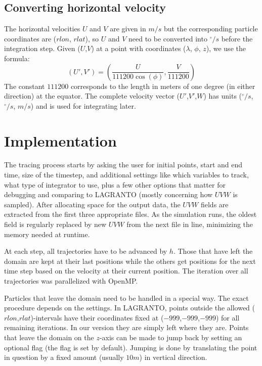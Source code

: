 \subsection{Converting horizontal velocity}
The horizontal velocities $U$ and $V$ are given in $m/s$ but the corresponding particle coordinates are ($rlon$, $rlat$), so $U$ and $V$ need to be converted into  $^\circ/s$ before the integration step. Given ($U$,$V$) at a point with coordinates ($\lambda$, $\phi$, $z$), we use the formula:
\begin{equation}
(U',V') = (\frac{U}{111200 \cos(\phi)}, \frac{V}{111200} )
\end{equation}
The constant $111200$ corresponds to the length in meters of one degree (in either direction) at the equator. The complete velocity vector ($U'$,$V'$,$W$) has units ($^\circ/s$, $^\circ/s$, $m/s$) and is used for integrating later.

\section{Implementation}
The tracing process starts by asking the user for initial points, start and end time, size of the timestep, and additional settings like which variables to track, what type of integrator to use, plus a few other options that matter for debugging and comparing to LAGRANTO (mostly concerning how $UVW$ is sampled). After allocating space for the output data, the $UVW$ fields are extracted from the first three appropriate files. As the simulation runs, the oldest field is regularly replaced by new $UVW$ from the next file in line, minimizing the memory needed at runtime.

At each step, all trajectories have to be advanced by $h$. Those that have left the domain are kept at their last positions while the others get positions for the next time step based on the velocity at their current position. The iteration over all trajectories was parallelized with OpenMP.

Particles that leave the domain need to be handled in a special way. The exact procedure depends on the settings. In LAGRANTO, points outside the allowed ($rlon$,$rlat$)-intervals have their coordinates fixed at ($-999$,$-999$,$-999$) for all remaining iterations. In our version they are simply left where they are. Points that leave the domain on the $z$-axis can be made to jump back by setting an optional flag (the flag is set by default). Jumping is done by translating the point in question by a fixed amount (usually $10m$) in vertical direction.
